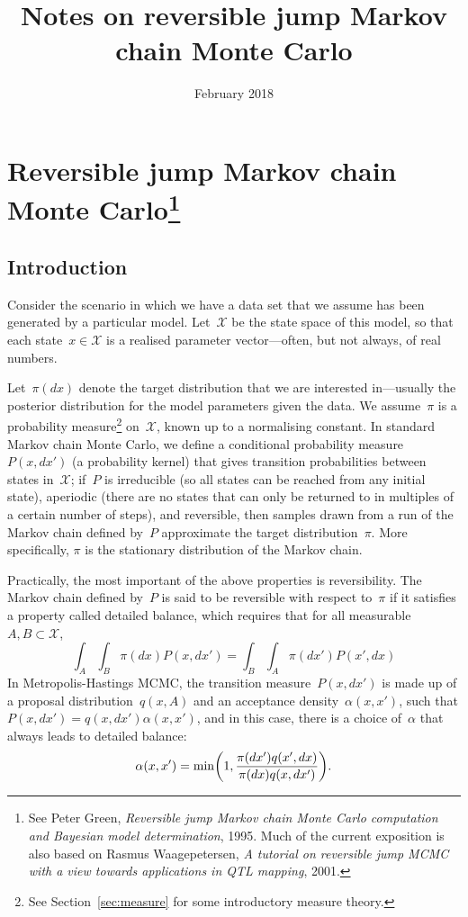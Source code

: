 \documentclass[11pt,a4paper]{article}
\title{Notes on reversible jump Markov chain Monte Carlo}
\author{}
\date{February 2018}
\newcommand\mc[1]{\mathcal{#1}}                  %
\DeclarePairedDelimiter\lr{\lparen}{\rparen}     %
\theoremstyle{definition}
\begin{document}
\maketitle

\section[]{Reversible jump Markov chain Monte Carlo\footnote{See Peter Green,
\textit{Reversible jump Markov chain Monte Carlo computation and Bayesian model
determination}, 1995. Much of the current exposition is also based on Rasmus
Waagepetersen, \textit{A tutorial on reversible jump MCMC with a view towards
applications in QTL mapping}, 2001.}} %
\label{sec:rjmc}

\subsection{Introduction} %
\label{sec:intro}

Consider the scenario in which we have a data set that we assume has been
generated by a particular model. Let~$\mc{X}$ be the state space of this model,
so that each state~$x \in \mc{X}$ is a realised parameter vector---often, but
not always, of real numbers.

Let~$\pi(dx)$ denote the target distribution that we are interested in---usually
the posterior distribution for the model parameters given the data. We
assume~$\pi$ is a probability measure\footnote{See Section~\ref{sec:measure} for
some introductory measure theory.} on~$\mc{X}$, known up to a normalising
constant. In standard Markov chain Monte Carlo, we define a conditional
probability measure~$P(x,dx')$ (a probability kernel) that gives transition
probabilities between states in~$\mc{X}$; if~$P$ is irreducible (so all states
can be reached from any initial state), aperiodic (there are no states that can
only be returned to in multiples of a certain number of steps), and reversible,
then samples drawn from a run of the Markov chain defined by~$P$ approximate the
target distribution~$\pi$. More specifically, $\pi$ is the stationary
distribution of the Markov chain.

Practically, the most important of the above properties is reversibility. The
Markov chain defined by~$P$ is said to be reversible with respect to~$\pi$ if it
satisfies a property called detailed balance, which requires that for all
measurable $A,B \subset \mc{X}$,
\begin{equation}\label{eqn:balance mh}
  \int_A \int_B \pi(dx)P(x,dx') = \int_B \int_A \pi(dx')P(x',dx)
\end{equation}
In Metropolis-Hastings MCMC, the transition measure~$P(x,dx')$ is made up of a
proposal distribution~$q(x,A)$ and an acceptance density~$\alpha(x,x')$, such
that $P(x,dx') = q(x,dx')\alpha(x,x')$, and in this case, there is a choice
of~$\alpha$ that always leads to detailed balance:
\begin{equation}\label{eqn:alpha mh}
  \alpha(x,x') = \min\lr*{1,\frac{\pi(dx')q(x',dx)}{\pi(dx)q(x,dx')}}.
\end{equation}
\end{document}
